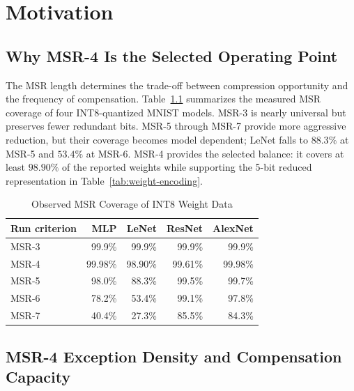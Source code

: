 \documentclass[12pt,a4paper]{report}
\begin{document}
\chapter{Motivation}
\label{ch:motivation}

\section{Why MSR-4 Is the Selected Operating Point}

The MSR length determines the trade-off between compression opportunity and the frequency of compensation. Table~\ref{tab:msr-coverage} summarizes the measured MSR coverage of four INT8-quantized MNIST models. MSR-3 is nearly universal but preserves fewer redundant bits. MSR-5 through MSR-7 provide more aggressive reduction, but their coverage becomes model dependent; LeNet falls to $88.3\%$ at MSR-5 and $53.4\%$ at MSR-6. MSR-4 provides the selected balance: it covers at least $98.90\%$ of the reported weights while supporting the 5-bit reduced representation in Table~\ref{tab:weight-encoding}.

\begin{table}[H]
\centering
\caption{Observed MSR Coverage of INT8 Weight Data}
\label{tab:msr-coverage}
\renewcommand{\arraystretch}{1.18}
\setlength{\tabcolsep}{12pt}
\begin{tabular}{lrrrr}
\toprule
\textbf{Run criterion} & \textbf{MLP} & \textbf{LeNet} & \textbf{ResNet} & \textbf{AlexNet} \\
\midrule
MSR-3 & 99.9\% & 99.9\% & 99.9\% & 99.9\% \\
MSR-4 & 99.98\% & 98.90\% & 99.61\% & 99.98\% \\
MSR-5 & 98.0\% & 88.3\% & 99.5\% & 99.7\% \\
MSR-6 & 78.2\% & 53.4\% & 99.1\% & 97.8\% \\
MSR-7 & 40.4\% & 27.3\% & 85.5\% & 84.3\% \\
\bottomrule
\end{tabular}
\end{table}

\section{MSR-4 Exception Density and Compensation Capacity}
\end{document}
